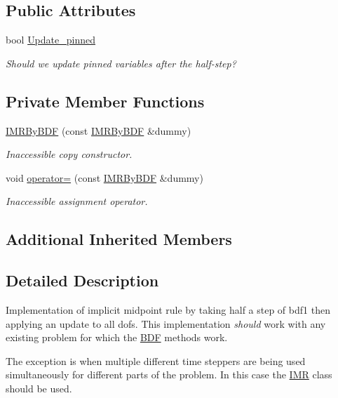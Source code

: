 \subsection*{Public Attributes}
\begin{DoxyCompactItemize}
\item 
bool \hyperlink{classoomph_1_1IMRByBDF_a1c2bf7b4272f4c5b28c2e6e9811b2e14}{Update\+\_\+pinned}
\begin{DoxyCompactList}\small\item\em Should we update pinned variables after the half-\/step? \end{DoxyCompactList}\end{DoxyCompactItemize}
\subsection*{Private Member Functions}
\begin{DoxyCompactItemize}
\item 
\hyperlink{classoomph_1_1IMRByBDF_a736422b80df5286da0a56301da073b16}{I\+M\+R\+By\+B\+DF} (const \hyperlink{classoomph_1_1IMRByBDF}{I\+M\+R\+By\+B\+DF} \&dummy)
\begin{DoxyCompactList}\small\item\em Inaccessible copy constructor. \end{DoxyCompactList}\item 
void \hyperlink{classoomph_1_1IMRByBDF_a0a1aec8458acb8cd8285f7b6d69fca4a}{operator=} (const \hyperlink{classoomph_1_1IMRByBDF}{I\+M\+R\+By\+B\+DF} \&dummy)
\begin{DoxyCompactList}\small\item\em Inaccessible assignment operator. \end{DoxyCompactList}\end{DoxyCompactItemize}
\subsection*{Additional Inherited Members}


\subsection{Detailed Description}
Implementation of implicit midpoint rule by taking half a step of bdf1 then applying an update to all dofs. This implementation {\itshape should} work with any existing problem for which the \hyperlink{classoomph_1_1BDF}{B\+DF} methods work.

The exception is when multiple different time steppers are being used simultaneously for different parts of the problem. In this case the \hyperlink{classoomph_1_1IMR}{I\+MR} class should be used. 

